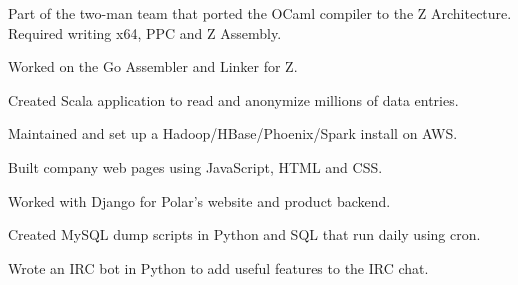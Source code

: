 \documentclass[letterpaper]{deedy-resume-modified} %
\begin{document}
\begin{minipage}[t]{0.66\textwidth}
\sectionspace %



\begin{tightitemize}
\item Part of the two-man team that ported the OCaml compiler to the Z Architecture. Required writing x64, PPC and Z Assembly.
\item Worked on the Go Assembler and Linker for Z.
\end{tightitemize}

\sectionspace %



\begin{tightitemize}
\item Created Scala application to read and anonymize millions of data entries.
\item Maintained and set up a Hadoop/HBase/Phoenix/Spark install on AWS.
\item Built company web pages using JavaScript, HTML and CSS.
\end{tightitemize}

\sectionspace %



\begin{tightitemize}
\item Worked with Django for Polar's website and product backend.
\item Created MySQL dump scripts in Python and SQL that run daily using cron.
\item Wrote an IRC bot in Python to add useful features to the IRC chat.
\end{tightitemize}

\sectionspace %

\vspace{-8pt}

\end{minipage}
\end{document}
